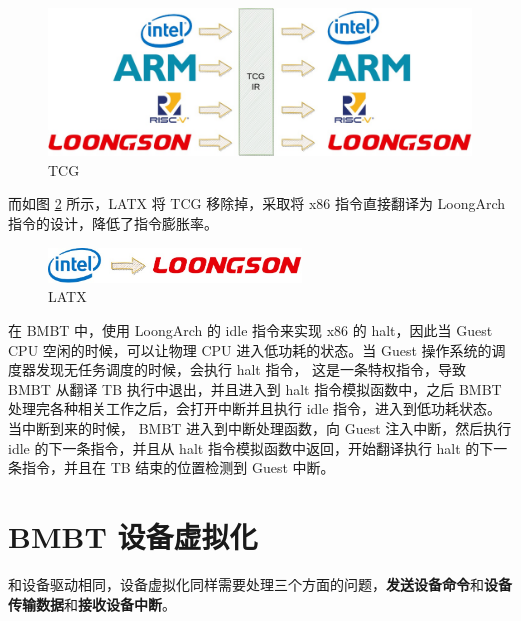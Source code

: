 \begin{figure}[!htbp]
	\centering
	\includegraphics[width=1.0\textwidth]{./images/tcg.jpg}
	\caption{TCG}
	\label{fig:tcg}
\end{figure}

而如图 \ref{fig:latx} 所示，LATX 将 TCG 移除掉，采取将 x86 指令直接翻译为 LoongArch 指令的设计，降低了指令膨胀率。

\begin{figure}[!htbp]
	\centering
	\includegraphics[width=0.6\textwidth]{./images/latx.jpg}
	\caption{LATX}
	\label{fig:latx}
\end{figure}

在 BMBT 中，使用 LoongArch 的 idle 指令来实现 x86 的 halt，因此当 Guest CPU 空闲的时候，可以让物理 CPU 进入低功耗的状态。当 Guest 操作系统的调度器发现无任务调度的时候，会执行 halt 指令，
这是一条特权指令，导致 BMBT 从翻译 TB 执行中退出，并且进入到 halt 指令模拟函数中，之后 BMBT 处理完各种相关工作之后，会打开中断并且执行 idle 指令，进入到低功耗状态。当中断到来的时候，
BMBT 进入到中断处理函数，向 Guest 注入中断，然后执行 idle 的下一条指令，并且从 halt 指令模拟函数中返回，开始翻译执行 halt 的下一条指令，并且在 TB 结束的位置检测到 Guest 中断。

\section{BMBT 设备虚拟化} \label{section:bmbt_device}
和设备驱动相同，设备虚拟化同样需要处理三个方面的问题，\textbf{发送设备命令}和\textbf{设备传输数据}和\textbf{接收设备中断}。

